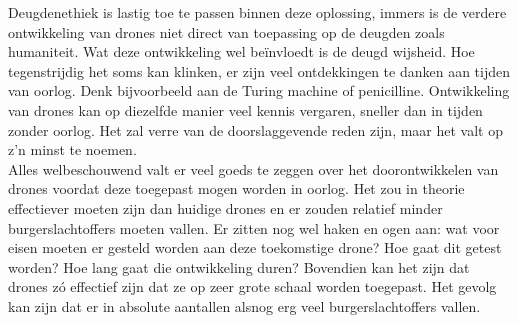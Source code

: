 Deugdenethiek is lastig toe te passen binnen deze oplossing, immers is de verdere ontwikkeling van drones niet direct van toepassing op de deugden zoals humaniteit. Wat deze ontwikkeling wel be\"invloedt is de deugd wijsheid. Hoe tegenstrijdig het soms kan klinken, er zijn veel ontdekkingen te danken aan tijden van oorlog. Denk bijvoorbeeld aan de Turing machine of penicilline. Ontwikkeling van drones kan op diezelfde manier veel kennis vergaren, sneller dan in tijden zonder oorlog. Het zal verre van de doorslaggevende reden zijn, maar het valt op z'n minst te noemen.\\

Alles welbeschouwend valt er veel goeds te zeggen over het doorontwikkelen van drones voordat deze toegepast mogen worden in oorlog. Het zou in theorie effectiever moeten zijn dan huidige drones en er zouden relatief minder burgerslachtoffers moeten vallen. Er zitten nog wel haken en ogen aan: wat voor eisen moeten er gesteld worden aan deze toekomstige drone? Hoe gaat dit getest worden? Hoe lang gaat die ontwikkeling duren? Bovendien kan het zijn dat drones z\'o effectief zijn dat ze op zeer grote schaal worden toegepast. Het gevolg kan zijn dat er in absolute aantallen alsnog erg veel burgerslachtoffers vallen.
